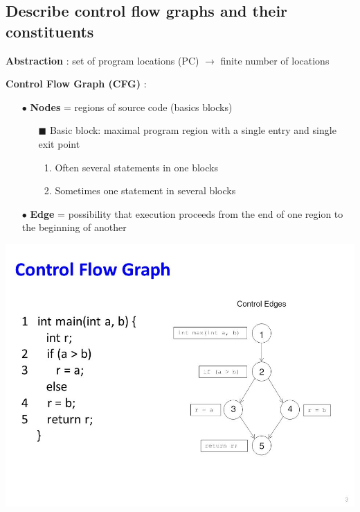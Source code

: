 \documentclass{article}
\begin{document}
\subsection{Describe control flow graphs and their constituents}
\noindent \textbf{Abstraction} : set of program locations (PC) $\rightarrow$ finite number of locations

\begin{multicols}{2}
\noindent \textbf{Control Flow Graph (CFG)} :
\begin{itemize}
    \item [$\bullet$]\textbf{Nodes} = regions of source code (basics blocks)
    \begin{itemize}
        \item[$\blacksquare$] Basic block: maximal program region with a single entry and single exit point
        \begin{enumerate}
            \item Often several statements in one blocks
            \item Sometimes one statement in several blocks
        \end{enumerate}
    \end{itemize}
    \item [$\bullet$]\textbf{Edge} = possibility that execution proceeds from the end of one region to the beginning of another
\end{itemize}

    \vfill\null
    \columnbreak

\begin{center}
    \includegraphics[scale=0.3]{image/1.jpg}
\end{center}
\end{multicols}
\end{document}
